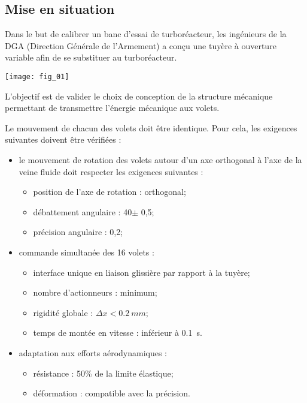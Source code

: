 \ifprof
\else
\begin{multicols}{2}
\fi
\section*{Mise en situation}
Dans le but de calibrer un banc d'essai de turboréacteur, les ingénieurs de la DGA (Direction Générale de l'Armement) a conçu une tuyère à ouverture variable afin de se substituer au turboréacteur. 
\begin{center}
\texttt{[image: fig\_01]}
\end{center}


\begin{obj}
L'objectif est de valider le choix de conception de la structure mécanique permettant
de transmettre l'énergie mécanique aux volets.
\end{obj}

Le mouvement de chacun des volets doit être identique. Pour cela, les exigences suivantes doivent être vérifiées :
\begin{itemize}
\item le mouvement de rotation des volets autour d'un axe orthogonal à l'axe de la veine fluide doit respecter les exigences suivantes : 
\begin{itemize}
\item position de l'axe de rotation : orthogonal;
\item débattement angulaire : 40\degres $\pm$ 0,5\degres;
\item précision angulaire : 0,2\degres;
\end{itemize}
\item commande simultanée des 16 volets :
\begin{itemize}
\item interface unique en liaison glissière par rapport à la tuyère;
\item nombre d'actionneurs : minimum;
\item rigidité globale : $\Delta x < \SI{0,2}{mm}$;
\item temps de montée en vitesse : inférieur à \SI{0,1}{s}.
\end{itemize}
\item adaptation aux efforts aérodynamiques :
\begin{itemize}
\item résistance : 50\% de la limite élastique;
\item déformation : compatible avec la précision.
\end{itemize}
\end{itemize}



\end{multicols}
